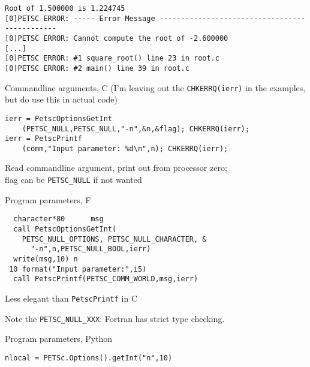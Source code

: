 \begin{details}
\begin{exerciseframe}[root]
\begingroup \tiny
\begin{verbatim}
Root of 1.500000 is 1.224745
[0]PETSC ERROR: ----- Error Message ----------------------------------------------
[0]PETSC ERROR: Cannot compute the root of -2.600000
[...]
[0]PETSC ERROR: #1 square_root() line 23 in root.c
[0]PETSC ERROR: #2 main() line 39 in root.c
\end{verbatim}
\endgroup
\end{exerciseframe}

\begin{numberedframe}{Commandline arguments, C}
(I'm leaving out the \lstinline{CHKERRQ(ierr)} in the examples,\\
but do use this in actual code)
\begin{lstlisting}
ierr = PetscOptionsGetInt
    (PETSC_NULL,PETSC_NULL,"-n",&n,&flag); CHKERRQ(ierr);
ierr = PetscPrintf
    (comm,"Input parameter: %d\n",n); CHKERRQ(ierr);
\end{lstlisting}
Read commandline argument, print out from processor zero;\\
flag can be \lstinline{PETSC_NULL} if not wanted
\end{numberedframe}

\lstset{language=Fortran}
\begin{fortran}
\begin{numberedframe}{Program parameters, F}
\begin{lstlisting}
  character*80      msg
  call PetscOptionsGetInt(
    PETSC_NULL_OPTIONS, PETSC_NULL_CHARACTER, &
      "-n",n,PETSC_NULL_BOOL,ierr)
  write(msg,10) n
 10 format("Input parameter:",i5)
  call PetscPrintf(PETSC_COMM_WORLD,msg,ierr)
\end{lstlisting}
Less elegant than \lstinline{PetscPrintf} in C

Note the \lstinline{PETSC_NULL_XXX}: Fortran has strict type checking.
\end{numberedframe}
\end{fortran}

\lstset{language=C}

\end{details}

\lstset{language=Python}
\begin{python}
\begin{numberedframe}{Program parameters, Python}
\begin{lstlisting}
nlocal = PETSc.Options().getInt("n",10)
\end{lstlisting}
\end{numberedframe}
\end{python}
\lstset{language=C}

\endinput

\begin{numberedframe}{, C}
\begin{verbatim}
\end{verbatim}
\end{numberedframe}

\begin{numberedframe}{, F}
\begin{verbatim}
\end{verbatim}
\end{numberedframe}

